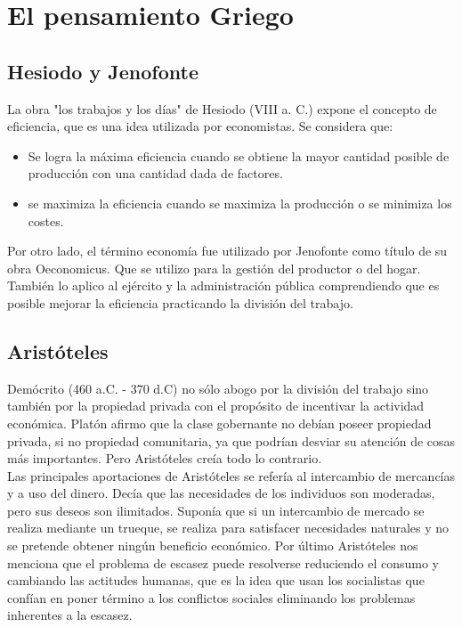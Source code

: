 \documentclass[10pt]{book}
\begin{document}
\section{El pensamiento Griego}
\subsection{Hesiodo y Jenofonte}
La obra "los trabajos y los días" de Hesiodo (VIII a. C.) expone el concepto de eficiencia, que es una idea utilizada por economistas. Se considera que:

\begin{itemize}
    \item Se logra la máxima eficiencia cuando se obtiene la mayor cantidad posible de producción con una cantidad dada de factores.
    \item se maximiza la eficiencia cuando se maximiza la producción o se minimiza los costes.
\end{itemize}

Por otro lado, el término economía fue utilizado por Jenofonte como título de su obra Oeconomicus. Que se utilizo para la gestión del productor o del hogar. También lo aplico al ejército y la administración pública comprendiendo que es posible mejorar la eficiencia practicando la división del trabajo.

\subsection{Aristóteles}
Demócrito (460 a.C. - 370 d.C) no sólo abogo por la división del trabajo sino también por la propiedad privada con el propósito de incentivar la actividad económica. Platón afirmo que la clase gobernante no debían poseer propiedad privada, si no propiedad comunitaria, ya que podrían desviar su atención de cosas más importantes. Pero Aristóteles creía todo lo contrario.\\

Las principales aportaciones de Aristóteles se refería al intercambio de mercancías y a uso del dinero. Decía que las necesidades de los individuos son moderadas, pero sus deseos son ilimitados. Suponía que si un intercambio de mercado se realiza mediante un trueque, se realiza para satisfacer necesidades naturales y no se pretende obtener ningún beneficio económico. Por último Aristóteles nos menciona que el problema de escasez puede resolverse reduciendo el consumo y cambiando las actitudes humanas, que es la idea que usan los socialistas que confían en poner término a los conflictos sociales eliminando los problemas inherentes a la escasez.
\end{document}
